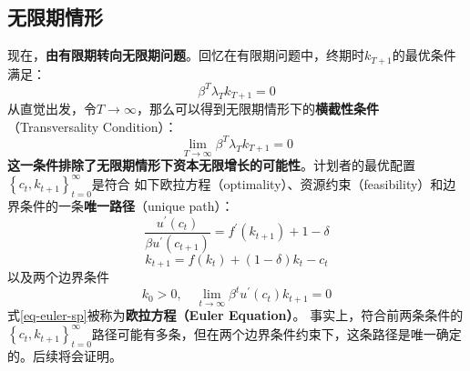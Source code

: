 \subsection{无限期情形} \label{subsec-infinit-h}

现在，\textbf{由有限期转向无限期问题}。回忆在有限期问题中，终期时$k_{T+1}$的最优条件满足：
$$\beta^T \lambda_T k_{T+1}=0$$
从直觉出发，令$T \rightarrow \infty$，那么可以得到无限期情形下的\textbf{横截性条件}（Transversality Condition）：
\begin{equation}
    \lim _{T \rightarrow \infty} \beta^T \lambda_T k_{T+1}=0
\end{equation}
\textbf{这一条件排除了无限期情形下资本无限增长的可能性}。计划者的最优配置$\left\{c_t, k_{t+1}\right\}_{t=0}^{\infty}$是符合
如下欧拉方程（optimality）、资源约束（feasibility）和边界条件的一条\textbf{唯一路径}（unique path）：
\begin{equation}    \label{eq-euler-sp}
    \frac{u^{\prime}\left(c_t\right)}{\beta u^{\prime}\left(c_{t+1}\right)}=f^{\prime}\left(k_{t+1}\right)+1-\delta
\end{equation}
\begin{equation}    \label{eq-res-const-sp}
    k_{t+1}=f\left(k_t\right)+(1-\delta) k_t-c_t
\end{equation}
以及两个边界条件
$$
k_0>0, \quad \lim _{t \rightarrow \infty} \beta^t u^{\prime}\left(c_t\right) k_{t+1}=0
$$
式\eqref{eq-euler-sp}被称为\textbf{欧拉方程（Euler Equation）}。
事实上，符合前两条条件的$\left\{c_t, k_{t+1}\right\}_{t=0}^{\infty}$路径可能有多条，但在两个边界条件约束下，这条路径是唯一确定的。后续将会证明。